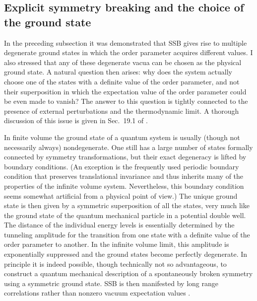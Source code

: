 \documentclass[final,2p,times,12pt,sort&compress]{elsarticle}
\begin{document}
\subsection{Explicit symmetry breaking and the choice of the ground state}
In the preceding subsection it was demonstrated that SSB gives rise to multiple
degenerate ground states in which the order parameter acquires different
values. I also stressed that any of these degenerate vacua can be chosen as the
physical ground state. A natural question then arises: why does the system
actually choose one of the states with a definite value of the order parameter,
and not their superposition in which the expectation value of the order
parameter could be even made to vanish? The answer to this question is tightly
connected to the presence of external perturbations and the thermodynamic limit.
A thorough discussion of this issue is given in Sec.~19.1 of
\cite{Weinberg:1996v2}.

In finite volume the ground state of a quantum system is usually (though not
necessarily always) nondegenerate. One still has a large number of states
formally connected by symmetry transformations, but their exact degeneracy is
lifted by boundary conditions. (An exception is the frequently used periodic
boundary condition that preserves translational invariance and thus inherits
many of the properties of the infinite volume system. Nevertheless, this
boundary condition seems somewhat artificial from a physical point of view.) The
unique ground state is then given by a symmetric superposition of all the
states, very much like the ground state of the quantum mechanical particle in a
potential double well. The distance of the individual energy levels is
essentially determined by the tunneling amplitude for the transition from one
state with a definite value of the order parameter to another. In the infinite
volume limit, this amplitude is exponentially suppressed and the ground states
become perfectly degenerate. In principle it is indeed possible, though
technically not so advantageous, to construct a quantum mechanical description
of a spontaneously broken symmetry using a symmetric ground state. SSB is then
manifested by long range correlations rather than nonzero vacuum expectation
values \cite{Yang:1962zz}.
\end{document}
